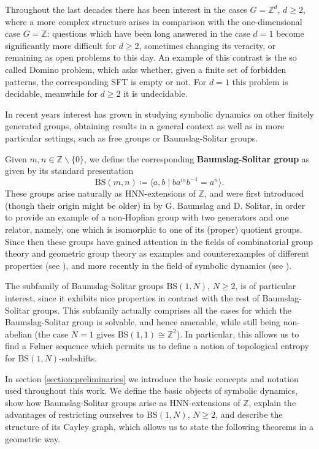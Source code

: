 \documentclass{aims}
\newcommand{\BS}[1][N]{\mathrm{BS}(1,#1)}
\theoremstyle{definition}
\begin{document}
Throughout the last decades there has been interest in the cases $G=\mathbb{Z}^d$, $d\ge 2$, where a more complex structure arises in comparison with the one-dimensional case $G=\mathbb{Z}$: questions which have been long answered in the case $d=1$ become significantly more difficult for $d\ge 2$, sometimes changing its veracity, or remaining as open problems to this day. An example of this contrast is the so called Domino problem, which asks whether, given a finite set of forbidden patterns, the corresponding SFT is empty or not. For $d=1$ this problem is decidable, meanwhile for $d\ge 2$ it is undecidable.

In recent years interest has grown in studying symbolic dynamics on other finitely generated groups, obtaining results in a general context as well as in more particular settings, such as free groups or Baumslag-Solitar groups.

Given $m,n\in \mathbb{Z}\backslash \{0\}$, we define the corresponding \textbf{Baumslag-Solitar group} as given by its standard presentation
$$
\mathrm{BS}(m,n)\coloneqq \langle a,b \mid ba^mb^{-1}=a^n \rangle.
$$
These groups arise naturally as HNN-extensions of $\mathbb{Z}$, and were first introduced (though their origin might be older) in \cite{baumslag_solitar_1962} by G. Baumslag and D. Solitar, in order to provide an example of a non-Hopfian group with two generators and one relator, namely, one which is isomorphic to one of its (proper) quotient groups. Since then these groups have gained attention in the fields of combinatorial group theory and geometric group theory as examples and counterexamples of different properties (see \cite{harpe_2003,meskin_1972}), and more recently in the field of symbolic dynamics (see \cite{aubrun_kari_2013,cyr2016distortion,esnay2020weakly}).

The subfamily of Baumslag-Solitar groups $\BS$, $N\ge 2$, is of particular interest, since it exhibits nice properties in contrast with the rest of Baumslag-Solitar groups. This subfamily actually comprises all the cases for which the Baumslag-Solitar group is solvable, and hence amenable, while still being non-abelian (the case $N=1$ gives $\mathrm{BS}(1,1)\cong \mathbb{Z}^2$). In particular, this allows us to find a F\o lner sequence which permits us to define a notion of topological entropy for $\BS$-subshifts. 

In section \ref{section:preliminaries} we introduce the basic concepts and notation used throughout this work. We define the basic objects of symbolic dynamics, show how Baumslag-Solitar groups arise as HNN-extensions of $\mathbb{Z}$, explain the advantages of restricting ourselves to $\BS$, $N\ge 2$, and describe the structure of its Cayley graph, which allows us to state the following theorems in a geometric way.
\end{document}

